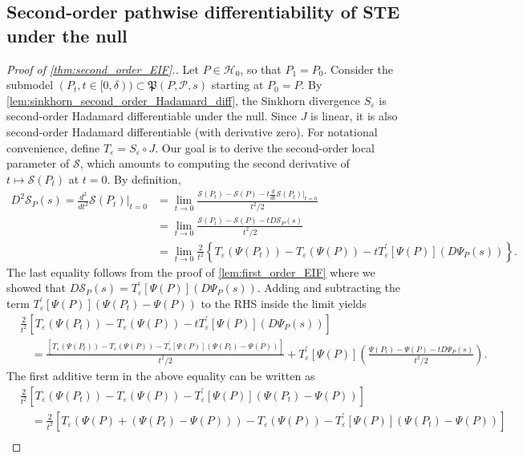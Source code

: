 \documentclass{article}
\theoremstyle{plain}
\theoremstyle{definition}
\theoremstyle{remark}
\newcommand{\of}[1]{\left(#1\right)}
\newcommand{\off}[1]{\left[#1\right]}
\newcommand{\offf}[1]{\left\{#1\right\}}
\newcommand{\cP}{\mathcal{P}}
\newcommand{\fP}{\mathfrak{P}}
\newcommand{\ucH}{\mathscr{H}}
\newcommand{\1}{\mathbbm{1}}
\newcommand{\STE}{\mathscr{S}}
\newcommand{\eps}{\varepsilon}
\theoremstyle{plain}
\theoremstyle{definition}
\begin{document}
\subsection{Second-order pathwise differentiability of STE under the null}
\begin{proof}[Proof of \cref{thm:second_order_EIF}.]
Let $P \in \ucH_0$, so that $P_1 = P_0$. Consider the submodel $(P_t, t \in [0, \delta)) \subset \fP(P, \cP, s)$ starting at $P_0 = P$. By \cref{lem:sinkhorn_second_order_Hadamard_diff}, the Sinkhorn divergence $S_\eps$ is second-order Hadamard differentiable under the null. Since $J$ is linear, it is also second-order Hadamard differentiable (with derivative zero). For notational convenience, define $T_\eps = S_\eps \circ J$. Our goal is to derive the second-order local parameter of $\STE$, which amounts to computing the second derivative of $t \mapsto \STE(P_t)$ at $t=0$. By definition,
\begin{align*}
         D^2 \STE_P(s)  = \frac{d^2}{d t^2} \STE(P_t) \Big \vert_{t=0}&= \lim_{t \to 0} \frac{\STE(P_t) - \STE(P) - t \frac{d}{d t} \STE(P_t) \vert_{t=0}}{t^2/2}\\
         &= \lim_{t \to 0} \frac{\STE(P_t) - \STE(P)- t D\STE_P(s)}{t^2/2}\\
         &= \lim_{t \to 0} \frac{2}{t^2} \offf{T_\eps(\Psi(P_t)) - T_\eps(\Psi(P)) - t T_\eps^\prime[\Psi(P)](D\Psi_P(s)) }.
    \end{align*}
The last equality follows from the proof of \cref{lem:first_order_EIF} where we showed that $D\STE_P(s) = T_\eps^\prime[\Psi(P)](D\Psi_P(s))$. Adding and subtracting the term $T_\eps^\prime[\Psi(P)](\Psi(P_t) - \Psi(P))$ to the RHS inside the limit yields
\begin{align*}
     &\frac{2}{t^2} \off{T_\eps(\Psi(P_t)) - T_\eps(\Psi(P)) - t T_\eps^\prime[\Psi(P)](D\Psi_P(s)) }\\
     &\quad = \frac{ \off{T_\eps(\Psi(P_t)) - T_\eps(\Psi(P)) - T_\eps^\prime[\Psi(P)]\of{\Psi(P_t) - \Psi(P)}}}{t^2/2} + T_\eps^\prime[\Psi(P)]\of{\frac{\Psi(P_t) - \Psi(P) - t D\Psi_P(s)}{t^2/2}}.
\end{align*}
The first additive term in the above equality can be written as 
\begin{align*}
    &\frac{2}{t^2}{ \off{T_\eps(\Psi(P_t)) - T_\eps(\Psi(P)) - T_\eps^\prime[\Psi(P)]\of{\Psi(P_t) - \Psi(P)}}} \\
    & \quad = \frac{2}{t^2}{ \off{T_\eps\of{\Psi(P) + \of{\Psi(P_t) - \Psi(P)}} - T_\eps(\Psi(P)) - T_\eps^\prime[\Psi(P)]\of{\Psi(P_t) - \Psi(P)}}}\\

\end{align*}
\end{proof}
\end{document}
